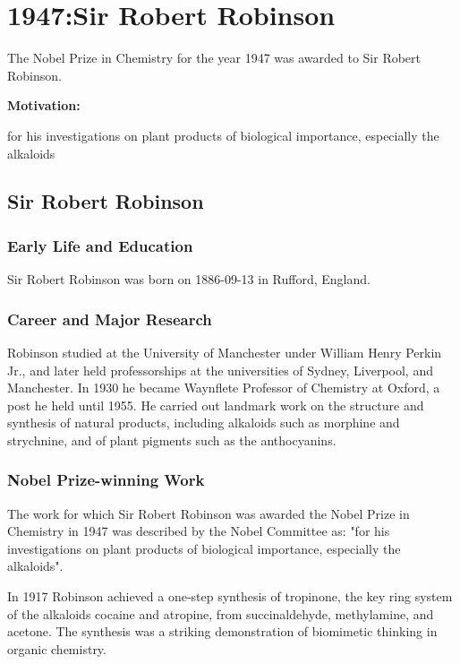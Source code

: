 \chapter{1947:Sir Robert Robinson}

\label{chap:chemistry1947}

The Nobel Prize in Chemistry for the year 1947 was awarded to Sir Robert Robinson.

\textbf{Motivation:}

for his investigations on plant products of biological importance, especially the alkaloids

\section{Sir Robert Robinson}

\subsection*{Early Life and Education}

Sir Robert Robinson was born on 1886-09-13 in Rufford, England.

\subsection*{Career and Major Research}

Robinson studied at the University of Manchester under William Henry Perkin Jr., and later held professorships at the universities of Sydney, Liverpool, and Manchester. In 1930 he became Waynflete Professor of Chemistry at Oxford, a post he held until 1955. He carried out landmark work on the structure and synthesis of natural products, including alkaloids such as morphine and strychnine, and of plant pigments such as the anthocyanins.

\subsection*{Nobel Prize-winning Work}

The work for which Sir Robert Robinson was awarded the Nobel Prize in Chemistry in 1947 was described by the Nobel Committee as: "for his investigations on plant products of biological importance, especially the alkaloids".

In 1917 Robinson achieved a one-step synthesis of tropinone, the key ring system of the alkaloids cocaine and atropine, from succinaldehyde, methylamine, and acetone. The synthesis was a striking demonstration of biomimetic thinking in organic chemistry.

